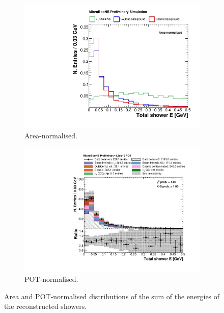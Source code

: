 \begin{figure}[htbp]
\centering
  \begin{subfigure}{0.49\textwidth}
    \includegraphics[width=\linewidth]{figures/shower_energy_norm.pdf}
    \caption{Area-normalised.} \label{fig:shower_energy_integral}
  \end{subfigure}
    \begin{subfigure}{0.49\textwidth}
    \includegraphics[width=\linewidth]{figures/shower_energy_pot.pdf}
    \caption{POT-normalised.} \label{fig:shower_energy_pot}
  \end{subfigure}
  \caption{Area and POT-normalised distributions of the sum of the energies of the reconstructed showers.}
\end{figure}



